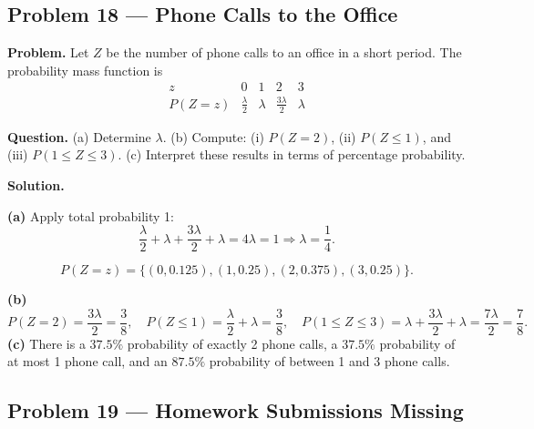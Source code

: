 \begin{ExamProblems}
		
		\item
		\subsection*{Problem 18 — Phone Calls to the Office}
		
		\textbf{Problem.}
		Let $Z$ be the number of phone calls to an office in a short period. The probability mass function is
		\[
		\begin{array}{c|cccc}
			z & 0 & 1 & 2 & 3\\
			\hline
			P(Z=z) & \frac{\lambda}{2} & \lambda & \frac{3\lambda}{2} & \lambda
		\end{array}
		\]
		
		\textbf{Question.}
		(a) Determine $\lambda$.
		(b) Compute: (i) $P(Z=2)$, (ii) $P(Z\le 1)$, and (iii) $P(1\le Z\le 3)$.
		(c) Interpret these results in terms of percentage probability.
		
		\textbf{Solution.}

		\textbf{(a)} Apply total probability 1:
		\[
		\frac{\lambda}{2}+\lambda+\frac{3\lambda}{2}+\lambda=4\lambda=1\Rightarrow \lambda=\frac{1}{4}.
		\]

		
\[
		P(Z=z)=\{(0,0.125),(1,0.25),(2,0.375),(3,0.25)\}.
		\]
\begin{center}
		\end{center}
\textbf{(b)}
		\[
		P(Z=2)=\frac{3\lambda}{2}=\frac{3}{8},\quad
		P(Z\le 1)=\frac{\lambda}{2}+\lambda=\frac{3}{8},\quad
		P(1\le Z\le 3)=\lambda+\frac{3\lambda}{2}+\lambda=\frac{7\lambda}{2}=\frac{7}{8}.
		\]
		\textbf{(c)} There is a $37.5\%$ probability of exactly 2 phone calls, a $37.5\%$ probability of at most 1 phone call, and an $87.5\%$ probability of between 1 and 3 phone calls.
		
		
		\item
		\subsection*{Problem 19 — Homework Submissions Missing}
		

\end{ExamProblems}

